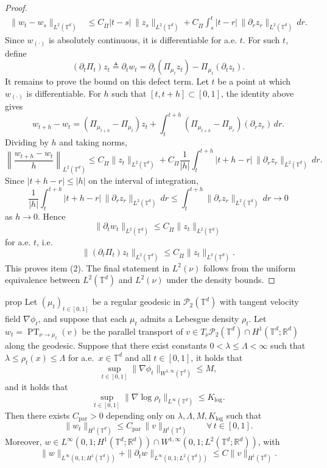 \documentclass[11pt]{article}
\newcommand{\PT}{\operatorname{PT}}
\begin{document}
\begin{proof}
\begin{align*}
\|w_t-w_s\|_{L^2(\mathbb{T}^d)}
&\le
C_{\dot\Pi}|t-s|\,\|z_s\|_{L^2(\mathbb{T}^d)}
+
C_{\dot\Pi}\int_s^t |t-r|\,\|\partial_r z_r\|_{L^2(\mathbb{T}^d)}\,dr.
\end{align*}
Since $w_{(\cdot)}$ is absolutely continuous, it is differentiable for a.e. $t$.
For such $t$, define
\[
(\partial_t\Pi_t)z_t \triangleq \partial_t w_t
=
\partial_t(\Pi_{\mu_t}z_t)-\Pi_{\mu_t}(\partial_t z_t).
\]
It remains to prove the bound on this defect term. Let $t$ be a point at which $w_{(\cdot)}$ is differentiable. For $h$ such that
$[t,t+h]\subset [0,1]$, the identity above gives
\[
w_{t+h}-w_t
=
(\Pi_{\mu_{t+h}}-\Pi_{\mu_t})z_t
+
\int_t^{t+h}(\Pi_{\mu_{t+h}}-\Pi_{\mu_r})(\partial_r z_r)\,dr.
\]
Dividing by $h$ and taking norms,
\[
\left\|\frac{w_{t+h}-w_t}{h}\right\|_{L^2(\mathbb{T}^d)}
\le
C_{\dot\Pi}\|z_t\|_{L^2(\mathbb{T}^d)}
+
C_{\dot\Pi}\frac{1}{|h|}
\int_t^{t+h}|t+h-r|\,\|\partial_r z_r\|_{L^2(\mathbb{T}^d)}\,dr.
\]
Since $|t+h-r|\le |h|$ on the interval of integration,
\[
\frac{1}{|h|}
\int_t^{t+h}|t+h-r|\,\|\partial_r z_r\|_{L^2(\mathbb{T}^d)}\,dr
\le
\int_t^{t+h}\|\partial_r z_r\|_{L^2(\mathbb{T}^d)}\,dr
\to 0
\]
as $h\to 0$. Hence
\[
\|\partial_t w_t\|_{L^2(\mathbb{T}^d)}
\le
C_{\dot\Pi}\|z_t\|_{L^2(\mathbb{T}^d)}
\]
for a.e. $t$, i.e.
\[
\|(\partial_t\Pi_t)z_t\|_{L^2(\mathbb{T}^d)}
\le
C_{\dot\Pi}\|z_t\|_{L^2(\mathbb{T}^d)}.
\]
This proves item (2). The final statement in $L^2(\nu)$ follows from the uniform equivalence between
$L^2(\mathbb{T}^d)$ and $L^2(\nu)$ under the density bounds.
\end{proof}


\begin{restatable}{prop}{}\label{prop:h1}
    Let $(\mu_t)_{t\in[0,1]}$ be a regular geodesic in $\mathcal{P}_2(\mathbb{T}^d)$ with tangent velocity field $\nabla\phi_t$, and suppose that each $\mu_t$ admits a Lebesgue density $\rho_t$. Let $w_t = \PT_{\nu \to \mu_t}(v)$ be the parallel transport of $v \in T_\nu \mathcal{P}_2(\mathbb{T}^d) \cap H^1(\mathbb{T}^d;\mathbb{R}^d)$ along the geodesic. Suppose that there exist constants $0 < \lambda \le \Lambda < \infty$ such that $\lambda \le \rho_t(x) \le \Lambda$ for a.e.\ $x \in \mathbb{T}^d$ and all $t \in [0,1]$, it holds that \[\displaystyle\sup_{t \in [0,1]} \|\nabla\phi_t\|_{W^{1,\infty}(\mathbb{T}^d)} \le M,\] 
    and it holds that  \[\displaystyle\sup_{t \in [0,1]} \|\nabla \log \rho_t\|_{L^\infty(\mathbb{T}^d)} \le K_{\log}.\] Then there exists $C_{\mathrm{par}} > 0$ depending only on $\lambda, \Lambda, M, K_{\log}$ such that
    \[
        \|w_t\|_{H^1(\mathbb{T}^d)} \le C_{\mathrm{par}}\,\|v\|_{H^1(\mathbb{T}^d)} \qquad \forall\, t \in [0,1].
    \]
    Moreover, $w \in L^\infty(0,1;H^1(\mathbb T^d;\mathbb R^d))
    \cap W^{1,\infty}(0,1;L^2(\mathbb T^d;\mathbb R^d))$, with
    \[
    \|w\|_{L^\infty(0,1;H^1(\mathbb T^d))}
    +\|\partial_t w\|_{L^\infty(0,1;L^2(\mathbb T^d))}
    \le C\|v\|_{H^1(\mathbb T^d)}.
    \]
\end{restatable}
\end{document}
